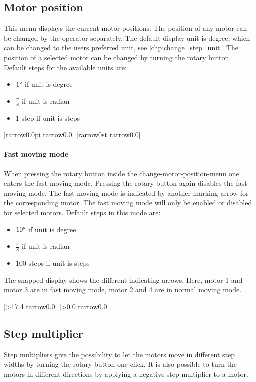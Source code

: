 \subsection{Motor position}
\label{menu_motor_pos}
This menu displays the current motor positions. The position of any motor can be
changed by the operator separately. The default display unit is degree, which
can be changed to the users preferred unit, see \ref{chp:change_step_unit}. The
position of a selected motor can be changed by turning the rotary
button. Default steps for the available units are:
\begin{itemize}
\item $1\degree$ if unit is degree
\item $\frac{\pi}{8}$ if unit is radian
\item 1 step if unit is steps
\end{itemize}
\begin{center}
  |{rarrow}0.0{pi}   {rarrow}0.0|
             |{rarrow}0st    {rarrow}0.0|
\end{center}


\paragraph{Fast moving mode}
When pressing the rotary button inside the change-motor-position-menu one
enters the fast moving mode. Pressing the rotary button again disables the
fast moving mode. The fast moving mode is indicated by another marking arrow
for the corresponding motor. The fast moving mode will only be enabled or
disabled for selected motors.
Default steps in this mode are:
\begin{itemize}
  \item $10\degree$ if unit is degree
  \item $\frac{\pi}{8}$ if unit is radian
  \item 100 steps if unit is steps
\end{itemize}
The snapped display shows the different indicating arrows. Here, motor 1
and motor 3 are in fast moving mode, motor 2 and 4 are in normal moving mode.
\begin{center}
  |>17.4  {rarrow}0.0|
             |>0.0   {rarrow}0.0|
\end{center}


\subsection{Step multiplier}
Step multipliers give the possibility to let the motors move in different
step widths by turning the rotary button one click. It is also possible
to turn the motors in different directions by applying a negative step
multiplier to a motor.

